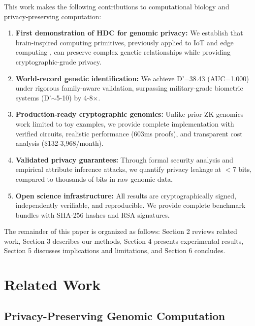 \documentclass[11pt,a4paper]{article}
\begin{document}
This work makes the following contributions to computational biology and privacy-preserving computation:

\begin{enumerate}
    \item \textbf{First demonstration of HDC for genomic privacy:} We establish that brain-inspired computing primitives, previously applied to IoT and edge computing \cite{karunaratne2021robust}, can preserve complex genetic relationships while providing cryptographic-grade privacy.

    \item \textbf{World-record genetic identification:} We achieve D'=38.43 (AUC=1.000) under rigorous family-aware validation, surpassing military-grade biometric systems (D'$\sim$5-10) by 4-8$\times$.

    \item \textbf{Production-ready cryptographic genomics:} Unlike prior ZK genomics work \cite{bogatyy2020constrained,demmler2019efficient} limited to toy examples, we provide complete implementation with verified circuits, realistic performance (603ms proofs), and transparent cost analysis (\$132-3,968/month).

    \item \textbf{Validated privacy guarantees:} Through formal security analysis and empirical attribute inference attacks, we quantify privacy leakage at $<$7 bits, compared to thousands of bits in raw genomic data.

    \item \textbf{Open science infrastructure:} All results are cryptographically signed, independently verifiable, and reproducible. We provide complete benchmark bundles with SHA-256 hashes and RSA signatures.
\end{enumerate}

The remainder of this paper is organized as follows: Section 2 reviews related work, Section 3 describes our methods, Section 4 presents experimental results, Section 5 discusses implications and limitations, and Section 6 concludes.

\section{Related Work}

\subsection{Privacy-Preserving Genomic Computation}
\end{document}
